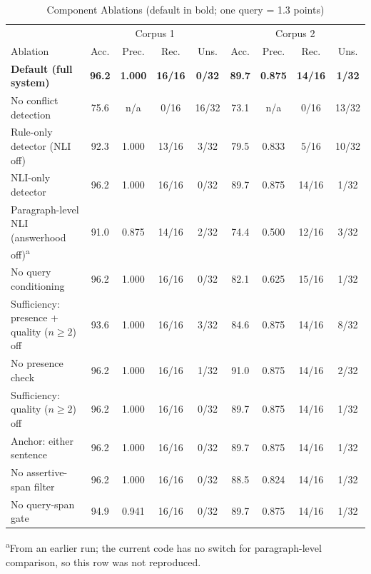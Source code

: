\documentclass[conference]{IEEEtran}
\begin{document}
\begin{table}[t]
\caption{Component Ablations (default in bold; one query = 1.3 points)}
\label{tab:component_ablation}
\centering
\small
\begin{tabular}{l c c c c c c c c}
\toprule
 & \multicolumn{4}{c}{Corpus 1} & \multicolumn{4}{c}{Corpus 2} \\
Ablation & Acc. & Prec. & Rec. & Uns. & Acc. & Prec. & Rec. & Uns. \\
\midrule
\textbf{Default (full system)} & \textbf{96.2} & \textbf{1.000} & \textbf{16/16} & \textbf{0/32}
                               & \textbf{89.7} & \textbf{0.875} & \textbf{14/16} & \textbf{1/32} \\
No conflict detection                 & 75.6 & n/a   & 0/16  & 16/32 & 73.1 & n/a   & 0/16  & 13/32 \\
Rule-only detector (NLI off)          & 92.3 & 1.000 & 13/16 & 3/32  & 79.5 & 0.833 & 5/16  & 10/32 \\
NLI-only detector                     & 96.2 & 1.000 & 16/16 & 0/32  & 89.7 & 0.875 & 14/16 & 1/32 \\
Paragraph-level NLI (answerhood off)\textsuperscript{a} & 91.0 & 0.875 & 14/16 & 2/32  & 74.4 & 0.500 & 12/16 & 3/32 \\
No query conditioning                 & 96.2 & 1.000 & 16/16 & 0/32  & 82.1 & 0.625 & 15/16 & 1/32 \\
Sufficiency: presence + quality ($n\geq2$) off & 93.6 & 1.000 & 16/16 & 3/32 & 84.6 & 0.875 & 14/16 & 8/32 \\
No presence check                     & 96.2 & 1.000 & 16/16 & 1/32  & 91.0 & 0.875 & 14/16 & 2/32 \\
Sufficiency: quality ($n\geq2$) off   & 96.2 & 1.000 & 16/16 & 0/32  & 89.7 & 0.875 & 14/16 & 1/32 \\
Anchor: either sentence               & 96.2 & 1.000 & 16/16 & 0/32  & 89.7 & 0.875 & 14/16 & 1/32 \\
No assertive-span filter              & 96.2 & 1.000 & 16/16 & 0/32  & 88.5 & 0.824 & 14/16 & 1/32 \\
No query-span gate                    & 94.9 & 0.941 & 16/16 & 0/32  & 89.7 & 0.875 & 14/16 & 1/32 \\
\bottomrule
\end{tabular}

\vspace{3pt}
\raggedright\scriptsize
\textsuperscript{a}From an earlier run; the current code has no switch for
paragraph-level comparison, so this row was not reproduced.
\end{table}




\balance
\end{document}
